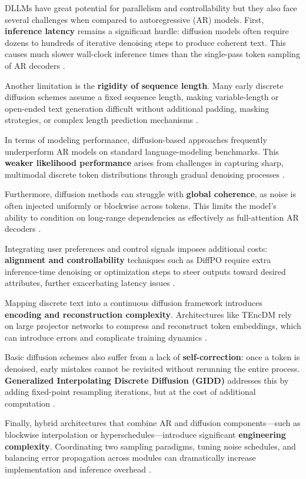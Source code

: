 DLLMs have great potential for parallelism and controllability but they also face several challenges when compared to autoregressive (AR) models. First, \textbf{inference latency} remains a significant hurdle: diffusion models often require dozens to hundreds of iterative denoising steps to produce coherent text. This causes much slower wall-clock inference times than the single-pass token sampling of AR decoders \cite{arriola_block_2025, zheng_reparameterized_2024}.

Another limitation is the \textbf{rigidity of sequence length}. Many early discrete diffusion schemes assume a fixed sequence length, making variable-length or open-ended text generation difficult without additional padding, masking strategies, or complex length prediction mechanisms \cite{arriola_block_2025, rutte_generalized_2025}.

In terms of modeling performance, diffusion-based approaches frequently underperform AR models on standard language-modeling benchmarks. This \textbf{weaker likelihood performance} arises from challenges in capturing sharp, multimodal discrete token distributions through gradual denoising processes \cite{arriola_block_2025, xu_energy-based_2025}.

Furthermore, diffusion methods can struggle with \textbf{global coherence}, as noise is often injected uniformly or blockwise across tokens. This limits the model’s ability to condition on long-range dependencies as effectively as full-attention AR decoders \cite{fathi_unifying_2025, arriola_block_2025}.

Integrating user preferences and control signals imposes additional costs: \textbf{alignment and controllability} techniques such as DiffPO require extra inference-time denoising or optimization steps to steer outputs toward desired attributes, further exacerbating latency issues \cite{chen_diffpo_2025}.

Mapping discrete text into a continuous diffusion framework introduces \textbf{encoding and reconstruction complexity}. Architectures like TEncDM rely on large projector networks to compress and reconstruct token embeddings, which can introduce errors and complicate training dynamics \cite{shabalin_tencdm_2025}.

Basic diffusion schemes also suffer from a lack of \textbf{self-correction}: once a token is denoised, early mistakes cannot be revisited without rerunning the entire process. \textbf{Generalized Interpolating Discrete Diffusion (GIDD)} addresses this by adding fixed-point resampling iterations, but at the cost of additional computation \cite{rutte_generalized_2025}.

Finally, hybrid architectures that combine AR and diffusion components—such as blockwise interpolation or hyperschedules—introduce significant \textbf{engineering complexity}. Coordinating two sampling paradigms, tuning noise schedules, and balancing error propagation across modules can dramatically increase implementation and inference overhead \cite{arriola_block_2025, fathi_unifying_2025}.

% 
% 